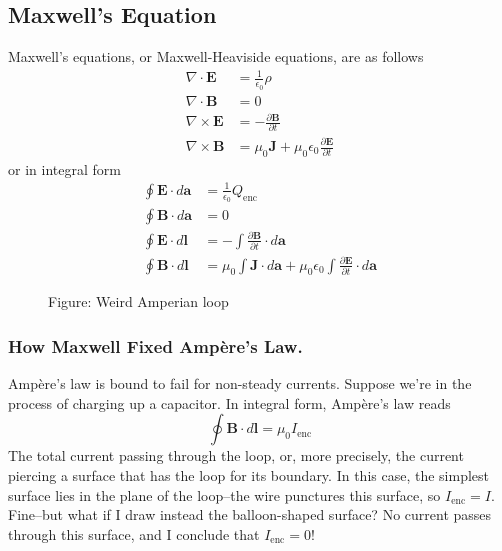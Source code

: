 \documentclass[../../../main.tex]{subfiles}
\begin{document}
\subsection*{Maxwell's Equation}
Maxwell's equations, or Maxwell-Heaviside equations, are as follows
\begin{align*}
    \nabla\cdot\mathbf{E}&=\frac{1}{\epsilon_0}\rho\\
    \nabla\cdot\mathbf{B}&=0\\
    \nabla\times\mathbf{E}&=-\frac{\partial \mathbf{B}}{\partial t}\\
    \nabla\times\mathbf{B}&=\mu_0\mathbf{J}+\mu_0\epsilon_0\frac{\partial \mathbf{E}}{\partial t}
\end{align*}
or in integral form 
\begin{align*}
    \oint \mathbf{E}\cdot d\mathbf{a}&=\frac{1}{\epsilon_0}Q_\text{enc}\\
    \oint \mathbf{B}\cdot d\mathbf{a}&=0\\
    \oint \mathbf{E}\cdot d\mathbf{l}&=-\int \frac{\partial \mathbf{B}}{\partial t}\cdot d\mathbf{a}\\
    \oint \mathbf{B}\cdot d\mathbf{l}&=\mu_0\int\mathbf{J}\cdot d\mathbf{a}+ \mu_0\epsilon_0 \int\frac{\partial \mathbf{E}}{\partial t}\cdot d\mathbf{a}
\end{align*}

\begin{figure*}[b]
    \centering
    \caption*{Figure: Weird Amperian loop}
\end{figure*}

\subsubsection*{How Maxwell Fixed Ampère’s Law.} Ampère’s law is bound to fail for non-steady currents. Suppose we’re in the process of charging up a capacitor. In integral form, Ampère’s law reads
\begin{equation*}
    \oint \mathbf{B}\cdot d\mathbf{l}=\mu_0 I_\text{enc}
\end{equation*}
The total current passing through the loop, or, more precisely, the current piercing a surface that has the loop for its boundary. In this case, the simplest surface lies in the plane of the loop--the wire punctures this surface, so $I_\text{enc} = I$. Fine--but what if I draw instead the balloon-shaped surface? No current passes through this surface, and I conclude that $I_\text{enc} = 0$!
\end{document}
